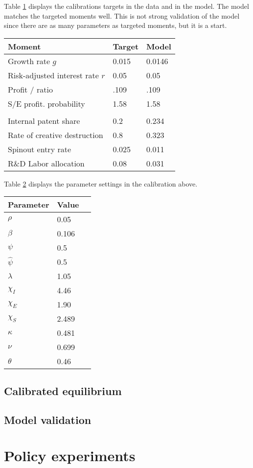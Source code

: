 \documentclass[12pt,english]{article}
\theoremstyle{remark}
\begin{document}
Table \ref{calibration_targets} displays the calibrations targets in the data and in the model. The model matches the targeted moments well. This is not strong validation of the model since there are as many parameters as targeted moments, but it is a start. 


\begin{table}
	\centering
	\label{calibration_targets}
	\begin{tabular}{lll}
		\hline
		Moment  & Target & Model \tabularnewline
		\hline 
		Growth rate $g$ & 0.015 & 0.0146 \tabularnewline
		Risk-adjusted interest rate $r$ & 0.05 & 0.05 \tabularnewline
		Profit / ratio & .109 & .109 \tabularnewline
		S/E profit. probability & 1.58 & 1.58 \tabularnewline
		\tabularnewline
		Internal patent share & 0.2 & 0.234
		\tabularnewline
		Rate of creative destruction & 0.8 & 0.323
		\tabularnewline
		Spinout entry rate & 0.025 & 0.011
		\tabularnewline
		R\&D Labor allocation & 0.08 & 0.031
	\end{tabular}
\end{table}

Table \ref{calibration_parameters} displays the parameter settings in the calibration above. 

\begin{table}
	\centering
	\begin{tabular}{lll}\label{calibration_parameters}
		Parameter & Value\tabularnewline
		\hline 
		$\rho$ & 0.05\tabularnewline
		$\beta$ & 0.106\tabularnewline
		$\psi$ & 0.5\tabularnewline
		$\hat{\psi}$ & 0.5\tabularnewline
		$\lambda$ & 1.05\tabularnewline
		$\chi_I$ & 4.46 \tabularnewline
		$\chi_E$ & 1.90 \tabularnewline
		$\chi_S$ & 2.489 \tabularnewline
		$\kappa$ & 0.481 \tabularnewline
		$\nu$ & 0.699 \tabularnewline
		$\theta$ & 0.46
	\end{tabular}
\end{table}

\subsection{Calibrated equilibrium}

\subsection{Model validation}

\section{Policy experiments}
\end{document}
